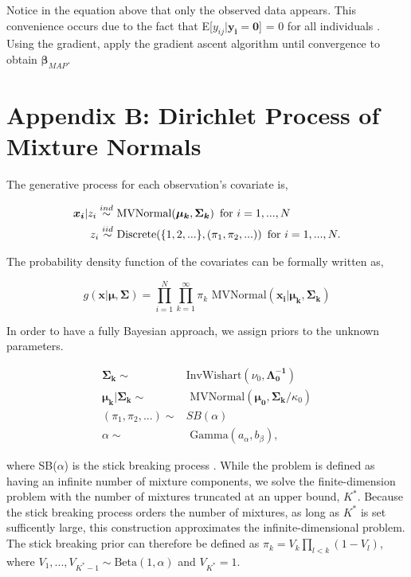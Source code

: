\documentclass[
  12pt,
]{article}
\begin{document}
Notice in the equation above that only the observed data appears. This
convenience occurs due to the fact that
E{[}\(y_{ij}|\boldsymbol{y_i}= \boldsymbol{0}\){]} = 0 for all
individuals \citep{alho_logistic_1990}. Using the gradient, apply the
gradient ascent algorithm until convergence to obtain
\(\boldsymbol{\beta}_{MAP}\).

\section{Appendix B: Dirichlet Process of Mixture Normals}
\label{DPnormalmix}

The generative process for each observation's covariate is,

\begin{align}
\boldsymbol{x_i}|z_i \stackrel{ind}{\sim} & \text{ MVNormal}(\boldsymbol{\mu_k},\boldsymbol{\Sigma_k}) \hspace{5px} \text{for } i=1,...,N\\
z_i \stackrel{iid}{\sim} & \text{ Discrete}(\{1,2,...\},(\pi_1,\pi_2,...)) \hspace{5px} \text{for } i=1,...,N.
\end{align}

The probability density function of the covariates can be formally
written as,

\begin{equation}
g(\boldsymbol{x}|\boldsymbol{\mu},\boldsymbol{\Sigma}) = \prod_{i=1}^N \prod_{k=1}^\infty \pi_k \text{ MVNormal}(\boldsymbol{x_i}|\boldsymbol{\mu_k},\boldsymbol{\Sigma_k})
\end{equation}

In order to have a fully Bayesian approach, we assign priors to the
unknown parameters.

\begin{align}
\boldsymbol{\Sigma_k} \sim & \text{InvWishart}(\nu_{0},\boldsymbol{\Lambda_{0}^{-1}}) \\
\boldsymbol{\mu_k}|\boldsymbol{\Sigma_k} \sim & \text{ MVNormal}(\boldsymbol{\mu_{0}},\boldsymbol{\Sigma_k}/\kappa_{0}) \\
(\pi_1,\pi_2,...) \sim & SB(\alpha) \\
\alpha \sim & \text{ Gamma}(a_{\alpha},b_{\beta}),
\end{align}

where SB(\(\alpha\)) is the stick breaking process
\citep{dunson_nonparametric_2009}. While the problem is defined as
having an infinite number of mixture components, we solve the
finite-dimension problem with the number of mixtures truncated at an
upper bound, \(K^*\). Because the stick breaking process orders the
number of mixtures, as long as \(K^*\) is set sufficently large, this
construction approximates the infinite-dimensional problem. The stick
breaking prior can therefore be defined as
\(\pi_k = V_k \prod_{l<k}(1-V_l)\), where
\(V_1, ..., V_{K^*-1} \sim \text{Beta}(1,\alpha)\) and \(V_{K^*}=1\).
\end{document}
